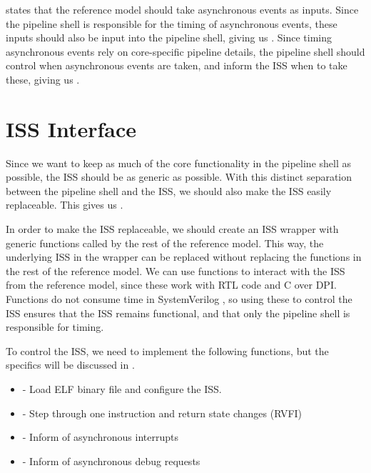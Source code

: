  states that the reference model should take asynchronous events as inputs. Since the pipeline shell is responsible for the timing of asynchronous events, these inputs should also be input into the pipeline shell, giving us . Since timing asynchronous events rely on core-specific pipeline details, the pipeline shell should control when asynchronous events are taken, and inform the ISS when to take these, giving us .



\section{ISS Interface}

Since we want to keep as much of the core functionality in the pipeline shell as possible, the ISS should be as generic as possible. With this distinct separation between the pipeline shell and the ISS, we should also make the ISS easily replaceable. This gives us \textbf{}. 

In order to make the ISS replaceable, we should create an ISS wrapper with generic functions called by the rest of the reference model. This way, the underlying ISS in the wrapper can be replaced without replacing the functions in the rest of the reference model.
We can use functions to interact with the ISS from the reference model, since these work with RTL code and C over DPI. Functions do not consume time in SystemVerilog \cite{mehtaIntroductionSystemVerilog2021}, so using these to control the ISS ensures that the ISS remains functional, and that only the pipeline shell is responsible for timing.

To control the ISS, we need to implement the following functions, but the specifics will be discussed in .

\begin{itemize}
    \item {} - Load ELF binary file and configure the ISS.
    \item {} - Step through one instruction and return state changes (RVFI)
    \item {} - Inform of asynchronous interrupts
    \item {} - Inform of asynchronous debug requests
\end{itemize}




